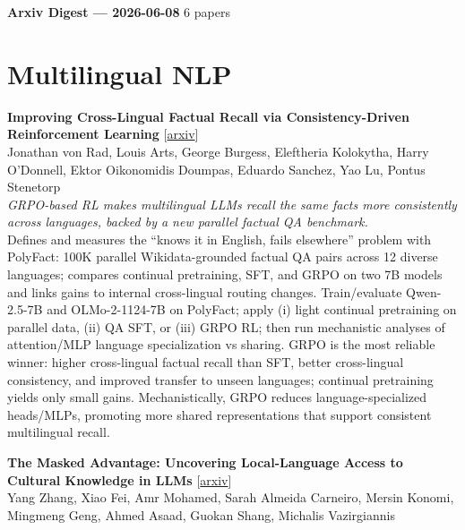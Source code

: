 \documentclass[12pt,letterpaper]{article}
\begin{document}
{\footnotesize\textbf{Arxiv Digest --- 2026-06-08} \hfill 6 papers}

\smallskip

\section*{Multilingual NLP}

{\small\textbf{Improving Cross-Lingual Factual Recall via Consistency-Driven Reinforcement Learning}} {\scriptsize[\href{https://arxiv.org/abs/2606.06586}{arxiv}]}\\
{\scriptsize Jonathan von Rad, Louis Arts, George Burgess, Eleftheria Kolokytha, Harry O'Donnell, Ektor Oikonomidis Doumpas, Eduardo Sanchez, Yao Lu, Pontus Stenetorp}\\

{\small\textit{GRPO-based RL makes multilingual LLMs recall the same facts more consistently across languages, backed by a new parallel factual QA benchmark.}}\\[1pt]
{\footnotesize Defines and measures the ``knows it in English, fails elsewhere'' problem with PolyFact: 100K parallel Wikidata-grounded factual QA pairs across 12 diverse languages; compares continual pretraining, SFT, and GRPO on two 7B models and links gains to internal cross-lingual routing changes. Train/evaluate Qwen-2.5-7B and OLMo-2-1124-7B on PolyFact; apply (i) light continual pretraining on parallel data, (ii) QA SFT, or (iii) GRPO RL; then run mechanistic analyses of attention/MLP language specialization vs sharing. GRPO is the most reliable winner: higher cross-lingual factual recall than SFT, better cross-lingual consistency, and improved transfer to unseen languages; continual pretraining yields only small gains. Mechanistically, GRPO reduces language-specialized heads/MLPs, promoting more shared representations that support consistent multilingual recall.}

\medskip

{\small\textbf{The Masked Advantage: Uncovering Local-Language Access to Cultural Knowledge in LLMs}} {\scriptsize[\href{https://arxiv.org/abs/2606.07422}{arxiv}]}\\
{\scriptsize Yang Zhang, Xiao Fei, Amr Mohamed, Sarah Almeida Carneiro, Mersin Konomi, Mingmeng Geng, Ahmed Asaad, Guokan Shang, Michalis Vazirgiannis}\\
\end{document}

